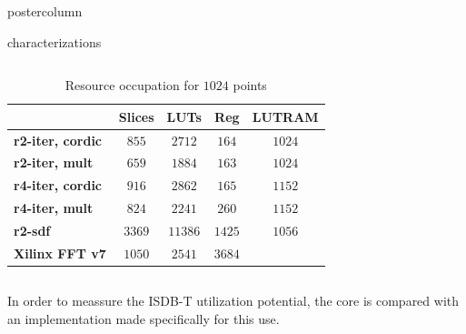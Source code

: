 \documentclass[final]{beamer}
\begin{document}
\begin{frame}{}
\begin{columns}
\begin{column}{.5\textwidth}
\begin{beamercolorbox}[center,wd=\textwidth]{postercolumn}
\begin{minipage}[T]{.99\textwidth}
{\begin{block}{characterizations}
\begin{column}{.34\textwidth}
			\end{column}
			\vrule
			\begin{column}{.55\textwidth}
				\begin{table}[htb!]
				\caption{Resource occupation for $1024$ points}
				\begin{tabular}{l c c c c}
				 & \textbf{Slices} & \textbf{LUTs} & \textbf{Reg} & \textbf{LUTRAM}\\ \hline 
				\textbf{r2-iter, cordic} & $855$ & $2712$ & $164$ & $1024$\\
				\textbf{r2-iter, mult} & $659$ & $1884$ & $163$ & $1024$\\
				\textbf{r4-iter, cordic} & $916$ & $2862$ & $165$ & $1152$\\
				\textbf{r4-iter, mult} & $824$ & $2241$ & $260$ & $1152$\\
				\textbf{r2-sdf} & $3369$ & $11386$ & $1425$ & $1056$\\
				\textbf{Xilinx FFT v7} & $1050$ & $2541$ & $3684$ & $ $\\ \hline
				\end{tabular}
				\label{table:res1024}
				\end{table}
			\end{column}
			
			\begin{column}{.39\textwidth}
			In order to meassure the ISDB-T utilization potential, the core is compared with an implementation made specifically for this use.\\
			

\end{column}
\end{block}}
\end{minipage}
\end{beamercolorbox}
\end{column}
\end{columns}
\end{frame}
\end{document}
